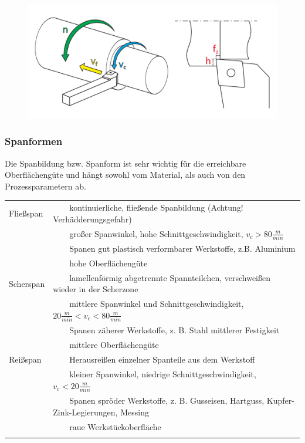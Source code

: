 \documentclass{\basedir/fablab-document}
\newcommand{\tabitem}{~~\llap{\textbullet}~~}
\begin{document}
\begin{figure}[ht]
\centering
\includegraphics[width = 0.9\linewidth]{img/drehprozess}
\end{figure}


\subsubsection{Spanformen}
Die Spanbildung bzw. Spanform ist sehr wichtig für die erreichbare Oberflächengüte und hängt sowohl vom Material, als auch von den Prozessparametern ab. \\[1em]
\begin{tabular}{ll}
    Fließspan		& \tabitem kontinuierliche, fließende Spanbildung (Achtung! Verhädderungsgefahr)													\\ 
			&	\tabitem großer Spanwinkel, hohe Schnittgeschwindigkeit, $v_c > 80 \frac{m}{min} $											\\
								&	\tabitem Spanen gut plastisch verformbarer Werkstoffe, z.B. Aluminium																		\\
								&	\tabitem hohe Oberflächengüte																																						\\ \addlinespace
    Scherspan		& \tabitem lamellenförmig abgetrennte Spannteilchen, verschweißen wieder in der Scherzone									\\ 
						&	\tabitem mittlere Spanwinkel und Schnittgeschwindigkeit, $20 \frac{m}{min} < v_c < 80 \frac{m}{min} $		\\
								&	\tabitem Spanen zäherer Werkstoffe, z. B. Stahl mittlerer Festigkeit 																		\\
								&	\tabitem mittlere Oberflächengüte																																				\\ \addlinespace
    Reißspan		& \tabitem Herausreißen einzelner Spanteile aus dem Werkstoff																							\\ 
			&	\tabitem kleiner Spanwinkel, niedrige Schnittgeschwindigkeit, $v_c < 20 \frac{m}{min} $									\\
								&	\tabitem Spanen spröder Werkstoffe, z. B. Gusseisen, Hartguss, Kupfer-Zink-Legierungen, Messing					\\
								&	\tabitem raue Werkstückoberfläche																																				\\ \addlinespace
\end{tabular}
\end{document}
